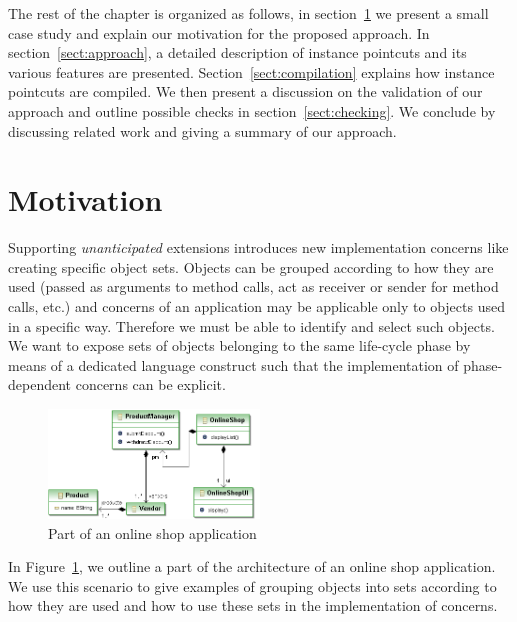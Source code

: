 The rest of the chapter is organized as follows, in section~\ref{sect:motivation} we present a small case study and explain our motivation for the proposed approach. In section~\ref{sect:approach}, a detailed description of instance pointcuts and its various features are presented. Section~\ref{sect:compilation} explains how instance pointcuts are compiled. We then present a discussion on the validation of our approach and outline possible checks in section~\ref{sect:checking}. We conclude by discussing related work and giving a summary of our approach.


\section{Motivation}
\label{sect:motivation}
Supporting \emph{unanticipated} extensions introduces new implementation concerns like creating specific object sets.
Objects can be grouped according to how they are used (passed as arguments to method calls, act as receiver or sender for method calls, etc.) and concerns of an application may be applicable only to objects used in a specific way.
Therefore we must be able to identify and select such objects.
We want to expose sets of objects belonging to the same life-cycle phase by means of a dedicated language construct such that the implementation of phase-dependent concerns can be explicit.

\begin{figure}[h]
\centering
\includegraphics[width=0.5\textwidth]{chapteripc/images/onlineshop2crop.png}%
\vspace{10pt}
\caption{Part of an online shop application}%
\label{fig:shop}%
\end{figure}

In Figure~\ref{fig:shop}, we outline a part of the architecture of an online shop application. We use this scenario to give examples of grouping objects into sets according to how they are used and how to use these sets in the implementation of concerns. 

